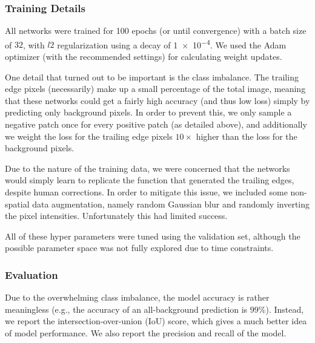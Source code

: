 \subsubsection{Training Details}

All networks were trained for 100 epochs (or until convergence) with a batch size of $32$, with $l2$ regularization using a decay of \num{1e-4}.
We used the Adam optimizer\cite{kingma2014adam} (with the recommended settings) for calculating weight updates.

One detail that turned out to be important is the class imbalance.
The trailing edge pixels (necessarily) make up a small percentage of the total image, meaning that these networks could get a fairly high accuracy (and thus low loss) simply by predicting only background pixels.
In order to prevent this, we only sample a negative patch once for every positive patch (as detailed above), and additionally we weight the loss for the trailing edge pixels $10\times$ higher than the loss for the background pixels.

Due to the nature of the training data, we were concerned that the networks would simply learn to replicate the function that generated the trailing edges, despite human corrections.
In order to mitigate this issue, we included some non-spatial data augmentation, namely random Gaussian blur and randomly inverting the pixel intensities.
Unfortunately this had limited success. %

All of these hyper parameters were tuned using the validation set, although the possible parameter space was not fully explored due to time constraints.

\subsubsection{Evaluation}


Due to the overwhelming class imbalance, the model accuracy is rather meaningless (e.g., the accuracy of an all-background prediction is $99\%$).
Instead, we report the intersection-over-union (IoU) score, which gives a much better idea of model performance.
We also report the precision and recall of the model.



